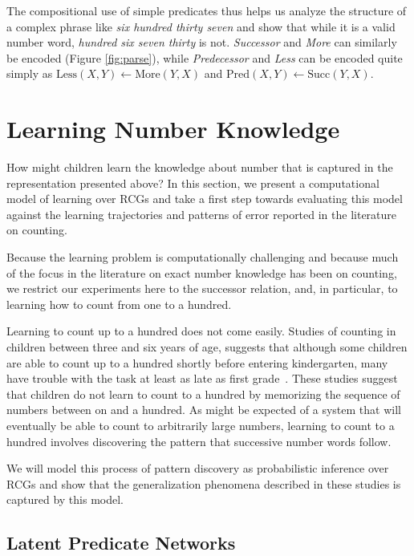 \documentclass[10pt,letterpaper]{article}
\begin{document}
\noindent The compositional use of simple predicates thus helps us
analyze the structure of a complex phrase like \emph{six hundred
  thirty seven} and show that while it is a valid number word,
\emph{hundred six seven thirty} is not. \emph{Successor} and
\emph{More} can similarly be encoded (Figure \ref{fig:parse}), while
\emph{Predecessor} and \emph{Less} can be encoded quite simply as
$\text{Less}(X,Y) \leftarrow \text{More}(Y,X)$ and $\text{Pred}(X,Y)
\leftarrow \text{Succ}(Y,X)$.

\section{Learning Number Knowledge}

How might children learn the knowledge about number that is captured
in the representation presented above? In this section, we present a
computational model of learning over RCGs and take a first step
towards evaluating this model against the learning trajectories and
patterns of error reported in the literature on counting. 

Because the learning problem is computationally challenging and
because much of the focus in the literature on exact number knowledge
has been on counting, we restrict our experiments here to the
successor relation, and, in particular, to learning how to count from
one to a hundred.

Learning to count up to a hundred does not come easily. Studies of
counting in children between three and six years of age, suggests that
although some children are able to count up to a hundred shortly
before entering kindergarten, many have trouble with the task at least
as late as first
grade~\cite{FusRicBriar1982,miller1987counting}. These studies suggest
that children do not learn to count to a hundred by memorizing the
sequence of numbers between on and a hundred. As might be expected of
a system that will eventually be able to count to arbitrarily large
numbers, learning to count to a hundred involves discovering the
pattern that successive number words follow. 

We will model this process of pattern discovery as probabilistic
inference over RCGs and show that the generalization phenomena
described in these studies is captured by this model. 

\subsection{Latent Predicate Networks}
\end{document}
